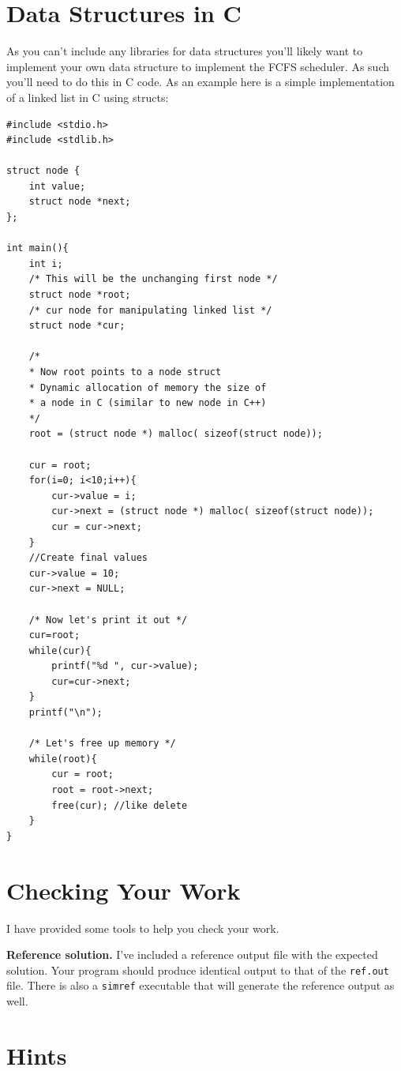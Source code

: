 \documentclass[11pt]{article}
\begin{document}
\section*{Data Structures in C}
As you can't include any libraries for data structures you'll likely want to implement your own data structure to implement the FCFS scheduler. As such you'll need to do this in C code. As an example here is a simple implementation of a linked list in C using structs:

\begin{verbatim}
#include <stdio.h>
#include <stdlib.h>

struct node {
    int value;
    struct node *next;
};

int main(){
    int i;
    /* This will be the unchanging first node */
    struct node *root;
    /* cur node for manipulating linked list */
    struct node *cur;      

    /* 
    * Now root points to a node struct 
    * Dynamic allocation of memory the size of 
    * a node in C (similar to new node in C++)
    */
    root = (struct node *) malloc( sizeof(struct node));

    cur = root;
    for(i=0; i<10;i++){
        cur->value = i;
        cur->next = (struct node *) malloc( sizeof(struct node));
        cur = cur->next;
    }
    //Create final values
    cur->value = 10;
    cur->next = NULL;

    /* Now let's print it out */
    cur=root;
    while(cur){
        printf("%d ", cur->value);
        cur=cur->next;
    }
    printf("\n");

    /* Let's free up memory */
    while(root){
        cur = root;
        root = root->next;
        free(cur); //like delete
    }          
}
\end{verbatim}



\section*{Checking Your Work}

I have provided some tools to help you check your work.

{\bf Reference solution.} I've included a reference output file with the expected solution. Your program should produce identical output to that of the {\tt ref.out} file. There is also a {\tt simref} executable that will generate the reference output as well. 

\section*{Hints}
\end{document}
